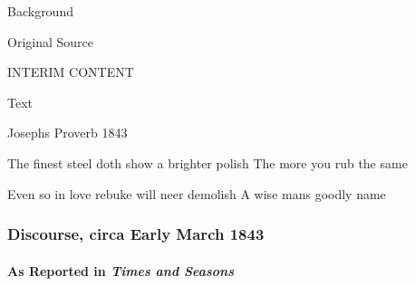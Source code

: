 			\begin{description}
				\item[Background]
			\end{description}
			
			
			\begin{description}
				\item[Original Source]
			\end{description}
			
				INTERIM CONTENT
			
			
			\begin{description}
				\item[Text]
			\end{description}
			
				\begin{tightcenter}
					Josephs Proverb 1843
				\end{tightcenter}
				
				The finest steel doth show a brighter polish The more you rub the same
				
				Even so in love rebuke will neer demolish A wise mans goodly name
				
		\subsubsection{Discourse, circa Early March 1843}
			\label{EMS-1843-JS-CIR-EAR-MAR-1843}
			
			\paragraph{As Reported in \textit{Times and Seasons}}
				\label{EMS-1843-JS-CIR-EAR-MAR-1843-TS}
			
